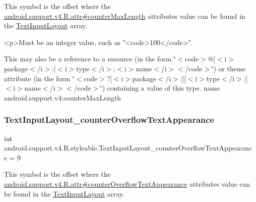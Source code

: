 This symbol is the offset where the \hyperlink{classandroid_1_1support_1_1v4_1_1R_1_1attr_af7b9dc9bb16b5e873c55ef844c21a8e3}{android.\+support.\+v4.\+R.\+attr\#counter\+Max\+Length} attribute\textquotesingle{}s value can be found in the \hyperlink{classandroid_1_1support_1_1v4_1_1R_1_1styleable_a86943debf88d7a9dc4c0627a8546913d}{Text\+Input\+Layout} array.

\begin{DoxyVerb}      <p>Must be an integer value, such as "<code>100</code>".
\end{DoxyVerb}
 

This may also be a reference to a resource (in the form \char`\"{}$<$code$>$@\mbox{[}$<$i$>$package$<$/i$>$\+:\mbox{]}$<$i$>$type$<$/i$>$\+:$<$i$>$name$<$/i$>$$<$/code$>$\char`\"{}) or theme attribute (in the form \char`\"{}$<$code$>$?\mbox{[}$<$i$>$package$<$/i$>$\+:\mbox{]}\mbox{[}$<$i$>$type$<$/i$>$\+:\mbox{]}$<$i$>$name$<$/i$>$$<$/code$>$\char`\"{}) containing a value of this type.  name android.\+support.\+v4\+:counter\+Max\+Length \mbox{\label{classandroid_1_1support_1_1v4_1_1R_1_1styleable_a0d4416285c0952ef775840d271901791}} 
\subsubsection{\texorpdfstring{Text\+Input\+Layout\+\_\+counter\+Overflow\+Text\+Appearance}{TextInputLayout\_counterOverflowTextAppearance}}
{\footnotesize\ttfamily int android.\+support.\+v4.\+R.\+styleable.\+Text\+Input\+Layout\+\_\+counter\+Overflow\+Text\+Appearance = 9\hspace{0.3cm}{\ttfamily [static]}}

This symbol is the offset where the \hyperlink{classandroid_1_1support_1_1v4_1_1R_1_1attr_a63a591c6ef1d16eccb62ea244723d4a3}{android.\+support.\+v4.\+R.\+attr\#counter\+Overflow\+Text\+Appearance} attribute\textquotesingle{}s value can be found in the \hyperlink{classandroid_1_1support_1_1v4_1_1R_1_1styleable_a86943debf88d7a9dc4c0627a8546913d}{Text\+Input\+Layout} array.

